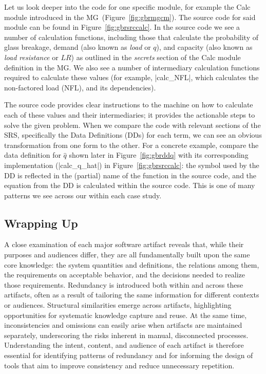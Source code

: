 
Let us look deeper into the code for one specific module, for example the Calc 
module introduced in the MG~(Figure~\ref{fig:gbrmgcm}). The source code for 
said module can be found in Figure~\ref{fig:gbrsrccalc}. In the source code we 
see a number of calculation functions, including those that calculate the 
probability of glass breakage, demand (also known as \emph{load} or $q$), and 
capacity (also known as \emph{load resistance} or $LR$) as outlined in the 
\emph{secrets} section of the Calc module definition in the MG. We also see a 
number of intermediary calculation functions required to calculate these
values (for example, |calc_NFL|, which calculates the non-factored
load (NFL), and its dependencies).

The source code provides clear instructions to the machine on how to calculate 
each of these values and their intermediaries; it provides the actionable steps 
to solve the given problem. When we compare the code with relevant sections of 
the SRS, specifically the Data Definitions (DDs) for each term, we can see an 
obvious transformation from one form to the other. For a concrete 
example, compare the data definition for $\hat{q}$ shown later in 
Figure~\ref{fig:gbrddq} with its corresponding implementation 
(|calc_q_hat|) in Figure~\ref{fig:gbrsrccalc}: the symbol used by 
the DD is reflected in the (partial) name of the function in the source code, 
and the equation from the DD is calculated within the source code. This is one 
of many patterns we see across our \sfs{} within each case study.

\subsection{Wrapping Up}

A close examination of each major software artifact reveals that, while their 
purposes and audiences differ, they are all fundamentally built upon the same 
core knowledge: the system quantities and definitions, the relations among 
them, the requirements on acceptable behavior, and the decisions needed to 
realize those requirements. Redundancy is introduced both within and across 
these artifacts, often as a result of tailoring the same information for 
different contexts or audiences. Structural similarities emerge across 
artifacts, highlighting opportunities for systematic knowledge capture and 
reuse. At the same time, inconsistencies and omissions can easily arise when 
artifacts are maintained separately, underscoring the risks inherent in manual, 
disconnected processes. Understanding the intent, content, and audience of each 
artifact is therefore essential for identifying patterns of redundancy and for 
informing the design of tools that aim to improve consistency and reduce 
unnecessary repetition.

